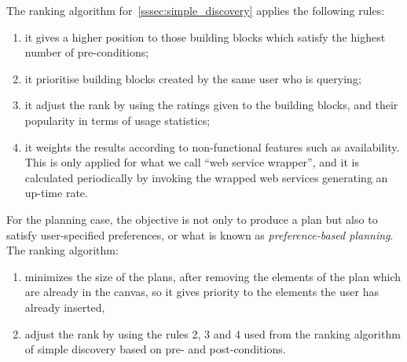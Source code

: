 The ranking algorithm for~\ref{sssec:simple_discovery} applies the following rules:
\begin{enumerate}
 \item it gives a higher position to those building blocks which satisfy the highest number of pre-conditions;
 \item it prioritise building blocks created by the same user who is querying;
 \item it adjust the rank by using the ratings given to the building blocks, and their popularity in terms of usage statistics;
 \item it weights the results according to non-functional features such as availability. This is only applied for what we call
``web service wrapper'', and it is calculated periodically by invoking the wrapped web services generating an up-time rate.
\end{enumerate}

For the planning case, the objective is not only to produce a plan but also to satisfy user-specified preferences, or what is
known as \emph{preference-based planning}. The ranking algorithm:
\begin{enumerate}
 \item minimizes the size of the plans, after removing the elements of the plan which are already in the canvas, so it gives
priority to the elements the user has already inserted,
 \item adjust the rank by using the rules 2, 3 and 4 used from the ranking algorithm of simple discovery based on 
pre- and post-conditions.
\end{enumerate}
